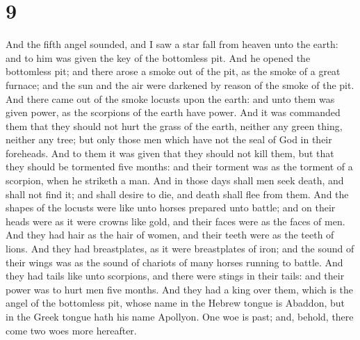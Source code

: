 \hypertarget{section-8}{%
\section{9}\label{section-8}}

 And the fifth angel sounded, and I saw a star fall from
heaven unto the earth: and to him was given the key of the bottomless
pit.  And he opened the bottomless pit; and there arose a
smoke out of the pit, as the smoke of a great furnace; and the sun and
the air were darkened by reason of the smoke of the pit. 
And there came out of the smoke locusts upon the earth: and unto them
was given power, as the scorpions of the earth have power.
 And it was commanded them that they should not hurt the
grass of the earth, neither any green thing, neither any tree; but only
those men which have not the seal of God in their foreheads.
 And to them it was given that they should not kill them,
but that they should be tormented five months: and their torment was as
the torment of a scorpion, when he striketh a man.  And in
those days shall men seek death, and shall not find it; and shall desire
to die, and death shall flee from them.  And the shapes of
the locusts were like unto horses prepared unto battle; and on their
heads were as it were crowns like gold, and their faces were as the
faces of men.  And they had hair as the hair of women, and
their teeth were as the teeth of lions.  And they had
breastplates, as it were breastplates of iron; and the sound of their
wings was as the sound of chariots of many horses running to battle.
 And they had tails like unto scorpions, and there were
stings in their tails: and their power was to hurt men five months.
 And they had a king over them, which is the angel of the
bottomless pit, whose name in the Hebrew tongue is Abaddon, but in the
Greek tongue hath his name Apollyon.  One woe is past;
and, behold, there come two woes more hereafter.

